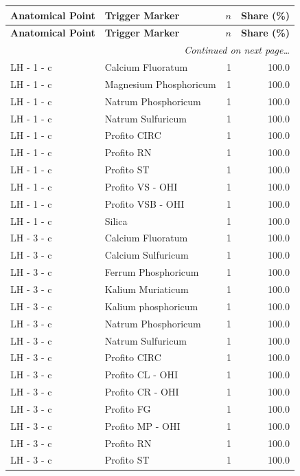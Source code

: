 \documentclass[a4paper,11pt]{article}
\begin{document}
\begin{footnotesize}
\begin{longtable}{p{3.5cm}p{7.5cm}rr}
\toprule
\textbf{Anatomical Point} &
\textbf{Trigger Marker} &
\textbf{$n$} &
\textbf{Share (\%)} \\
\midrule
\endfirsthead
\toprule
\textbf{Anatomical Point} &
\textbf{Trigger Marker} &
\textbf{$n$} &
\textbf{Share (\%)} \\
\midrule
\endhead
\midrule
\multicolumn{4}{r}{\footnotesize\emph{Continued on next page\ldots}} \\
\endfoot
\bottomrule
\endlastfoot
LH - 1 - c & Calcium Fluoratum & 1 & 100.0 \\
LH - 1 - c & Magnesium Phosphoricum & 1 & 100.0 \\
LH - 1 - c & Natrum Phosphoricum & 1 & 100.0 \\
LH - 1 - c & Natrum Sulfuricum & 1 & 100.0 \\
LH - 1 - c & Profito CIRC & 1 & 100.0 \\
LH - 1 - c & Profito RN & 1 & 100.0 \\
LH - 1 - c & Profito ST & 1 & 100.0 \\
LH - 1 - c & Profito VS - OHI & 1 & 100.0 \\
LH - 1 - c & Profito VSB - OHI & 1 & 100.0 \\
LH - 1 - c & Silica & 1 & 100.0 \\
LH - 3 - c & Calcium Fluoratum & 1 & 100.0 \\
LH - 3 - c & Calcium Sulfuricum & 1 & 100.0 \\
LH - 3 - c & Ferrum Phosphoricum & 1 & 100.0 \\
LH - 3 - c & Kalium Muriaticum & 1 & 100.0 \\
LH - 3 - c & Kalium phosphoricum & 1 & 100.0 \\
LH - 3 - c & Natrum Phosphoricum & 1 & 100.0 \\
LH - 3 - c & Natrum Sulfuricum & 1 & 100.0 \\
LH - 3 - c & Profito CIRC & 1 & 100.0 \\
LH - 3 - c & Profito CL - OHI & 1 & 100.0 \\
LH - 3 - c & Profito CR - OHI & 1 & 100.0 \\
LH - 3 - c & Profito FG & 1 & 100.0 \\
LH - 3 - c & Profito MP - OHI & 1 & 100.0 \\
LH - 3 - c & Profito RN & 1 & 100.0 \\
LH - 3 - c & Profito ST & 1 & 100.0 \\

\end{longtable}
\end{footnotesize}
\end{document}

